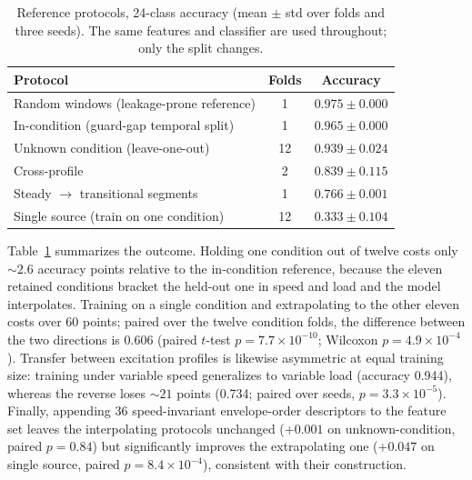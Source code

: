 \begin{table}[!t]
\caption{Reference protocols, 24-class accuracy (mean $\pm$ std over folds
and three seeds). The same features and classifier are used throughout;
only the split changes.}
\label{tab:condref}
\centering
\footnotesize
\setlength{\tabcolsep}{5pt}
\begin{tabular}{l c c}
\toprule
Protocol & Folds & Accuracy \\
\midrule
Random windows (leakage-prone reference)   & 1  & $0.975 \pm 0.000$ \\
In-condition (guard-gap temporal split)    & 1  & $0.965 \pm 0.000$ \\
Unknown condition (leave-one-out)          & 12 & $0.939 \pm 0.024$ \\
Cross-profile                              & 2  & $0.839 \pm 0.115$ \\
Steady $\rightarrow$ transitional segments & 1  & $0.766 \pm 0.001$ \\
Single source (train on one condition)     & 12 & $0.333 \pm 0.104$ \\
\bottomrule
\end{tabular}
\end{table}

Table~\ref{tab:condref} summarizes the outcome. Holding one condition out
of twelve costs only ${\sim}2.6$ accuracy points relative to the
in-condition reference, because the eleven retained conditions bracket the
held-out one in speed and load and the model interpolates. Training on a
single condition and extrapolating to the other eleven costs over 60
points; paired over the twelve condition folds, the difference between the
two directions is 0.606 (paired $t$-test $p = 7.7\times10^{-10}$; Wilcoxon
$p = 4.9\times10^{-4}$). Transfer between excitation profiles is likewise
asymmetric at equal training size: training under variable speed
generalizes to variable load (accuracy 0.944), whereas the reverse loses
${\sim}21$ points (0.734; paired over seeds, $p = 3.3\times10^{-5}$).
Finally, appending 36 speed-invariant envelope-order descriptors to the
feature set leaves the interpolating protocols unchanged ($+0.001$ on
unknown-condition, paired $p = 0.84$) but significantly improves the
extrapolating one ($+0.047$ on single source, paired
$p = 8.4\times10^{-4}$), consistent with their construction.

